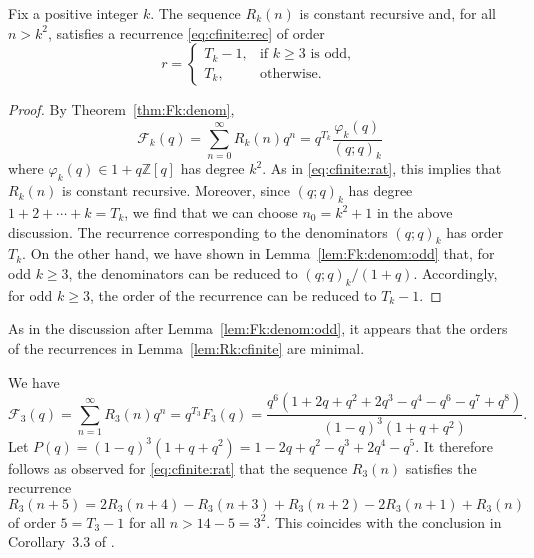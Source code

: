\documentclass[11pt]{article}
\theoremstyle{plain}
\theoremstyle{definition}
\begin{document}
\begin{lemma}
  \label{lem:Rk:cfinite}Fix a positive integer $k$. The sequence $R_k (n)$ is
  constant recursive and, for all $n > k^2$, satisfies a recurrence
  \eqref{eq:cfinite:rec} of order
  \begin{equation*}
    r = \left\{\begin{array}{ll}
       T_k - 1, & \text{if $k \geq 3$ is odd},\\
       T_k, & \text{otherwise} .
     \end{array}\right.
  \end{equation*}
\end{lemma}

\begin{proof}
  By Theorem~\ref{thm:Fk:denom},
  \begin{equation}
    \mathcal{F}_k (q) = \sum_{n = 0}^{\infty} R_k (n) q^n = q^{T_k}
    \frac{\varphi_k (q)}{(q ; q)_k} \label{eq:Rk:gf:rat}
  \end{equation}
  where $\varphi_k (q) \in 1 + q\mathbb{Z} [q]$ has degree $k^2$. As in
  \eqref{eq:cfinite:rat}, this implies that $R_k (n)$ is constant recursive.
  Moreover, since $(q ; q)_k$ has degree $1 + 2 + \cdots + k = T_k$, we find
  that we can choose $n_0 = k^2 + 1$ in the above discussion. The recurrence
  corresponding to the denominators $(q ; q)_k$ has order $T_k$. On the other
  hand, we have shown in Lemma~\ref{lem:Fk:denom:odd} that, for odd $k
  \geq 3$, the denominators can be reduced to $(q ; q)_k / (1 + q)$.
  Accordingly, for odd $k \geq 3$, the order of the recurrence can be
  reduced to $T_k - 1$.
\end{proof}

As in the discussion after Lemma~\ref{lem:Fk:denom:odd}, it appears that the
orders of the recurrences in Lemma~\ref{lem:Rk:cfinite} are minimal.

\begin{example}
  \label{eg:F3:rat}We have
  \begin{equation*}
    \mathcal{F}_3 (q) = \sum_{n = 1}^{\infty} R_3 (n) q^n = q^{T_3} F_3 (q) =
     \frac{q^6 (1 + 2 q + q^2 + 2 q^3 - q^4 - q^6 - q^7 + q^8)}{(1 - q)^3 (1 +
     q + q^2)} .
  \end{equation*}
  Let $P (q) = (1 - q)^3 (1 + q + q^2) = 1 - 2 q + q^2 - q^3 + 2 q^4 - q^5$.
  It therefore follows as observed for \eqref{eq:cfinite:rat} that the
  sequence $R_3 (n)$ satisfies the recurrence
  \begin{equation*}
    R_3 (n + 5) = 2 R_3 (n + 4) - R_3 (n + 3) + R_3 (n + 2) - 2 R_3 (n + 1) +
     R_3 (n)
  \end{equation*}
  of order $5 = T_3 - 1$ for all $n > 14 - 5 = 3^2$. This coincides with the
  conclusion in Corollary~3.3 of \cite{sharan-rook}.
\end{example}
\end{document}
